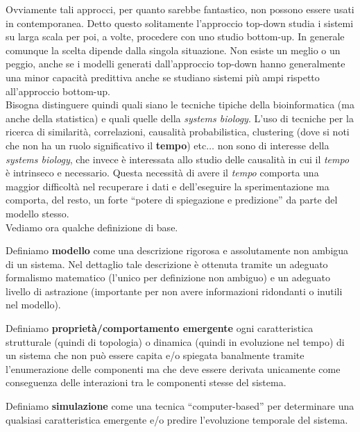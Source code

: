 \documentclass[a4paper,12pt, oneside]{book}
\begin{document}
Ovviamente tali approcci, per quanto sarebbe fantastico, non possono essere
usati in contemporanea. Detto questo solitamente l'approccio top-down studia i
sistemi su larga scala per poi, a volte, procedere con uno studio bottom-up. In
generale comunque la scelta dipende dalla singola situazione. Non esiste un
meglio o un peggio, anche se i modelli generati dall'approccio top-down hanno
generalmente una minor capacità predittiva anche se studiano sistemi più ampi
rispetto all'approccio bottom-up.\\
Bisogna distinguere quindi quali siano le tecniche tipiche della bioinformatica
(ma anche della statistica)
e quali quelle della \textit{systems biology}. L'uso di tecniche per la ricerca
di similarità, correlazioni, causalità probabilistica, clustering (dove si noti
che non ha un ruolo significativo il \textbf{tempo}) etc$\ldots$
non sono di interesse della \textit{systems biology}, che invece è interessata
allo studio delle causalità in cui il \textit{tempo} è intrinseco e
necessario. Questa necessità di avere il \textit{tempo} comporta una maggior
difficoltà nel recuperare i dati e dell'eseguire la sperimentazione ma comporta,
del resto, un forte ``potere di spiegazione e predizione'' da parte del modello
stesso. \\
Vediamo ora qualche definizione di base.
\begin{definizione}
  Definiamo \textbf{modello} come una descrizione rigorosa e assolutamente non
  ambigua di un sistema. Nel dettaglio tale descrizione è ottenuta tramite un
  adeguato formalismo matematico (l'unico per definizione non ambiguo) e un
  adeguato livello di astrazione (importante per non avere informazioni
  ridondanti o inutili nel modello). 
\end{definizione}
\begin{definizione}
  Definiamo \textbf{proprietà/comportamento emergente} ogni
  caratteristica strutturale (quindi di topologia) o dinamica (quindi in
  evoluzione nel tempo) di un sistema che non può essere capita e/o spiegata
  banalmente tramite l'enumerazione delle componenti ma che deve essere derivata
  unicamente come conseguenza delle interazioni tra le componenti stesse del
  sistema. 
\end{definizione}
\begin{definizione}
  Definiamo \textbf{simulazione} come una tecnica ``computer-based'' per
  determinare una qualsiasi caratteristica emergente e/o predire l'evoluzione
  temporale del sistema. 
\end{definizione}
\end{document}
